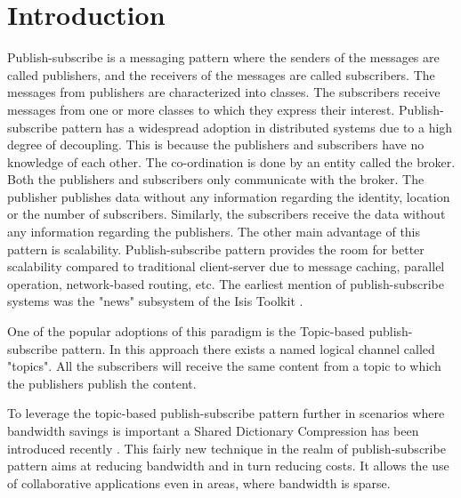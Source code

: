 \chapter{Introduction}\label{chapter:introduction}

Publish-subscribe is a messaging pattern where the senders of the messages are called publishers, and the receivers of the messages are called subscribers. The messages from publishers are characterized into classes. The subscribers receive messages from one or more classes to which they express their interest. Publish-subscribe pattern has a widespread adoption in distributed systems due to a high degree of decoupling. This is because the publishers and subscribers have no knowledge of each other. The co-ordination is done by an entity called the broker. Both the publishers and subscribers only communicate with the broker. The publisher publishes data without any information regarding the identity, location or the number of subscribers. Similarly, the subscribers receive the data without any information regarding the publishers. The other main advantage of this pattern is scalability. Publish-subscribe pattern provides the room for better scalability compared to traditional client-server due to message caching, parallel operation, network-based routing, etc. The earliest mention of publish-subscribe systems was the "news" subsystem of the Isis Toolkit \parencite{Birman:1987:EVS:37499.37515}.

One of the popular adoptions of this paradigm is the Topic-based publish-subscribe pattern. In this approach there exists a named logical channel called "topics". All the subscribers will receive the same content from a topic to which the publishers publish the content.

To leverage the topic-based publish-subscribe pattern further in scenarios where bandwidth savings is important a Shared Dictionary Compression has been introduced recently \parencite{Doblander:2016:SDC}. This fairly new technique in the realm of publish-subscribe pattern aims at reducing bandwidth and in turn reducing costs. It allows the use of collaborative applications even in areas, where bandwidth is sparse.